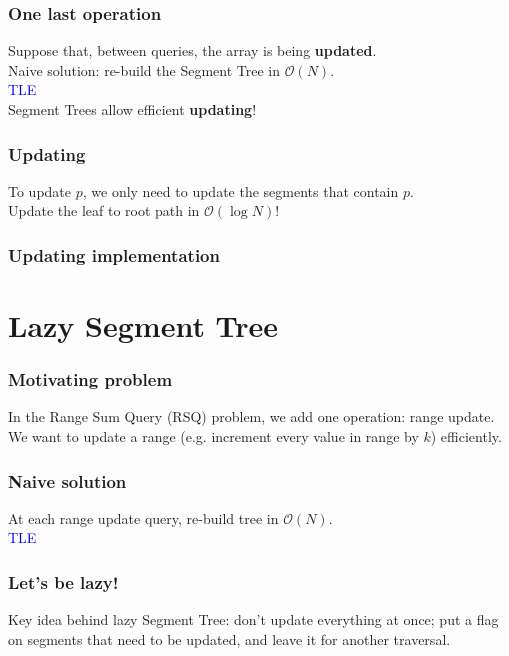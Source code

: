 \documentclass[12pt]{beamer}
\newcommand{\bigoh}{\mathcal{O}}
\begin{document}
\begin{frame}
    \frametitle{One last operation}
    Suppose that, between queries, the array is being \textbf{updated}.\\
    Naive solution: re-build the Segment Tree in $ \bigoh(N) $. \\
    \textcolor{blue}{TLE} \\
    Segment Trees allow efficient \textbf{updating}!
\end{frame}

\begin{frame}
    \frametitle{Updating}
    To update $p$, we only need to update the segments that contain $p$. \\
    Update the leaf to root path in $ \bigoh(\log N) $!
\end{frame}

\begin{frame}
    \frametitle{Updating implementation}
    
\end{frame}

\section{Lazy Segment Tree}

\begin{frame}
    \frametitle{Motivating problem}
    In the Range Sum Query (RSQ) problem, we add one operation: range update. \\
    We want to update a range (e.g. increment every value in range by $k$) efficiently.
\end{frame}

\begin{frame}
    \frametitle{Naive solution}
    At each range update query, re-build tree in $\bigoh(N)$. \\
    \textcolor{blue}{TLE}
\end{frame}

\begin{frame}
    \frametitle{Let's be lazy!}
    Key idea behind lazy Segment Tree: don't update everything at once; put a flag on segments that need to be updated, and leave it for another traversal. \\
\end{frame}
\end{document}
